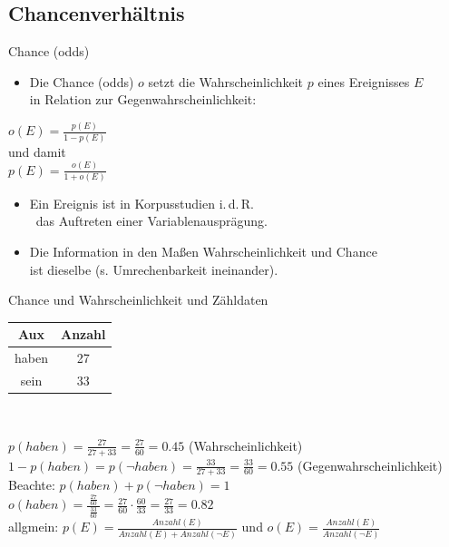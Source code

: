 \subsection[Chancenverhältnis]{Chancenverhältnis}

\begin{frame}
  {Chance (odds)}
  \begin{itemize}[<+->]
    \item Die \alert{Chance (odds)} $o$ setzt die Wahrscheinlichkeit $p$ eines Ereignisses $E$\\
      in Relation zur Gegenwahrscheinlichkeit:
  \end{itemize}
  \pause
   \begin{center}
     \alert{$o(E)=\frac{p(E)}{1-p(E)}$}\\[2ex]
     \pause
     und damit\\[2ex]
     \pause
     \alert{$p(E)=\frac{o(E)}{1+o(E)}$}
  \end{center}
  \pause
  \begin{itemize}[<+->]
    \item Ein Ereignis ist in Korpusstudien i.\,d.\,R.\\\
      das Auftreten einer \alert{Variablenausprägung}.
    \item Die Information in den Maßen Wahrscheinlichkeit und Chance\\
      ist dieselbe (s. Umrechenbarkeit ineinander).
  \end{itemize}
\end{frame}

\begin{frame}
  {Chance und Wahrscheinlichkeit und Zähldaten}
  \vspace{-1cm}
      \begin{center}
	\begin{tabular}{|c|c|}
	      \hline
	      \textbf{Aux} & \textbf{Anzahl} \\
	      \hline
	      haben   &  27   \\
	      \hline
	      sein   &  33   \\
	      \hline
	    \end{tabular}\\
      \end{center}
      \pause
      $p(haben)=\frac{27}{27+33}=\frac{27}{60}=0.45$ (Wahrscheinlichkeit)\\[2ex]
      \pause
      $1-p(haben)=p(\neg haben)=\frac{33}{27+33}=\frac{33}{60}=0.55$ (\alert{Gegenwahrscheinlichkeit})\\[2ex]
      \pause
      Beachte: $p(haben)+p(\neg haben)=1$\\[2ex]
      \pause
      \alert{$o(haben)=\frac{\ \frac{27}{60}\ }{\frac{33}{60}}=\frac{27}{60}\cdot\frac{60}{33}=\frac{27}{33}=0.82$}\\[2ex]
      \pause
      allgmein: \alert{$p(E)=\frac{Anzahl(E)}{Anzahl(E)+Anzahl(\neg E)}$} und \alert{$o(E)=\frac{Anzahl(E)}{Anzahl(\neg E)}$}\\[2ex]
\end{frame}

